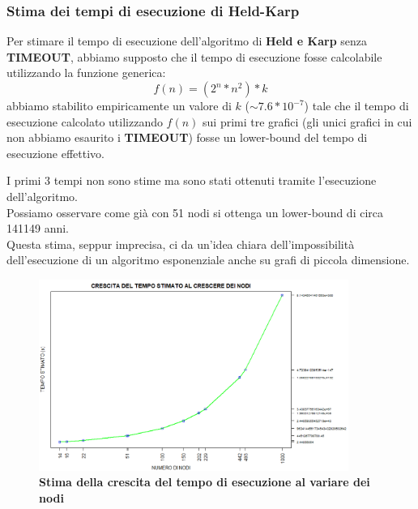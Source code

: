 \documentclass[]{article}
\begin{document}
\begin{flushleft}
\subsubsection{Stima dei tempi di esecuzione di Held-Karp}
Per stimare il tempo di esecuzione dell'algoritmo di \textbf{Held e Karp} senza \textbf{TIMEOUT}, abbiamo supposto che il tempo di esecuzione fosse calcolabile utilizzando la funzione generica: $$f(n) = (2^{n}*n^{2})*k$$
abbiamo stabilito empiricamente un valore di $k$ ($\sim 7.6*10^{-7}$) tale che il tempo di esecuzione calcolato utilizzando $f(n)$ sui primi tre grafici (gli unici grafici in cui non abbiamo esaurito i \textbf{TIMEOUT}) fosse un lower-bound del tempo di esecuzione effettivo.

I primi 3 tempi non sono stime ma sono stati ottenuti tramite l'esecuzione dell'algoritmo.\\
Possiamo osservare come già con  51 nodi si ottenga un lower-bound di circa 141149 anni.\\
Questa stima, seppur imprecisa, ci da un'idea chiara dell'impossibilità dell'esecuzione di un algoritmo esponenziale anche su grafi di piccola dimensione.
\begin{figure}[h]
\centering
\includegraphics[width=0.9\textwidth, height=\textheight,keepaspectratio]{STIME_TEMPO.png}
\caption{\textbf{Stima della crescita del tempo di esecuzione al variare dei nodi}}
\label{STIME_temp}
\end{figure}
\end{flushleft}
\end{document}
